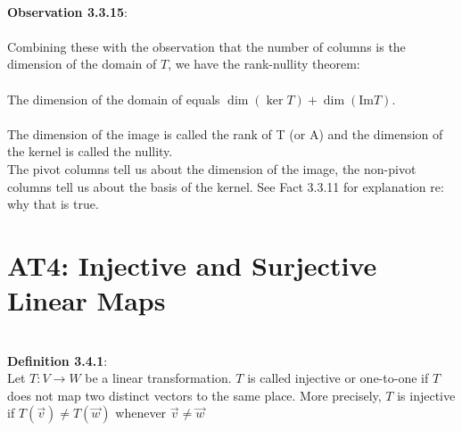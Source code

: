 \documentclass{article}
\begin{document}
\\
\noindent \textbf{Observation 3.3.15}:\\
\\
Combining these with the observation that the number of columns is the dimension of the domain of $T$, we have the rank-nullity theorem:\\
\\
The dimension of the domain of equals $\dim(\ker T)+\dim(\text{Im} T)$.\\
\\
The dimension of the image is called the rank of T (or A) and the dimension of the kernel is called the nullity.
\\
The pivot columns tell us about the dimension of the image, the non-pivot columns tell us about the basis of the kernel. See Fact 3.3.11 for explanation re: why that is true. \\
\newpage

\section{AT4: Injective and Surjective Linear Maps}\\
\noindent \textbf{ Definition 3.4.1}:\\
Let $T: V \to W$  be a linear transformation. $T$ is called injective or one-to-one if $T$ does not map two distinct vectors to the same place. More precisely, $T$ is injective if $T(\vec{v}) \neq T(\vec{w})$ whenever $\vec{v} \neq \vec{w}$\\
\end{document}

